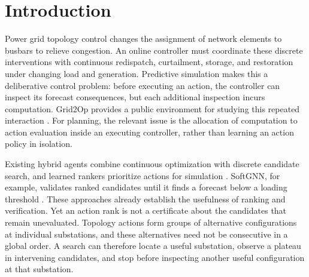 \begin{abstract}
Online power grid controllers use predictive simulation to compare topology interventions before execution. A global candidate order can interleave configurations of the same substation, so stopping after a favorable prefix or a reward plateau may leave a promising local decision unresolved; conversely, exhaustive evaluation spends computation on the entire eligible library. We propose a replaceable search layer that expands a ranked prefix using observed feedback and, after an extended-search stop, completes the unqueried configurations associated with the incumbent's substation. Under a common frequency order and hybrid controller, a four-date development study reduces candidate queries by 69.37\% and measured controller time by 13.11\% relative to exhaustive search, while completion reduces the worst complete-week cost increase from 4.81\% to 0.372\%. A separately frozen three-date study retains all failures and timing repeats, reduces queries by 83.54\% on the two dates with search and controller time by 6.09\% across all three dates, and satisfies the predeclared cost and survival screen; the first-safe reference is also competitive on these new dates, limiting claims of superiority.
\end{abstract}
\section{Introduction}

Power grid topology control changes the assignment of network elements to busbars to relieve congestion. An online controller must coordinate these discrete interventions with continuous redispatch, curtailment, storage, and restoration under changing load and generation. Predictive simulation makes this a deliberative control problem: before executing an action, the controller can inspect its forecast consequences, but each additional inspection incurs computation. Grid2Op provides a public environment for studying this repeated interaction \citep{grid2op}. For planning, the relevant issue is the allocation of computation to action evaluation inside an executing controller, rather than learning an action policy in isolation.


Existing hybrid agents combine continuous optimization with discrete candidate search, and learned rankers prioritize actions for simulation \citep{ljn2023agent,hassouna2025softgnn,dejong2025generalizablev1}. SoftGNN, for example, validates ranked candidates until it finds a forecast below a loading threshold \citep{hassouna2025softgnn}. These approaches already establish the usefulness of ranking and verification. Yet an action rank is not a certificate about the candidates that remain unevaluated. Topology actions form groups of alternative configurations at individual substations, and these alternatives need not be consecutive in a global order. A search can therefore locate a useful substation, observe a plateau in intervening candidates, and stop before inspecting another useful configuration at that substation.


